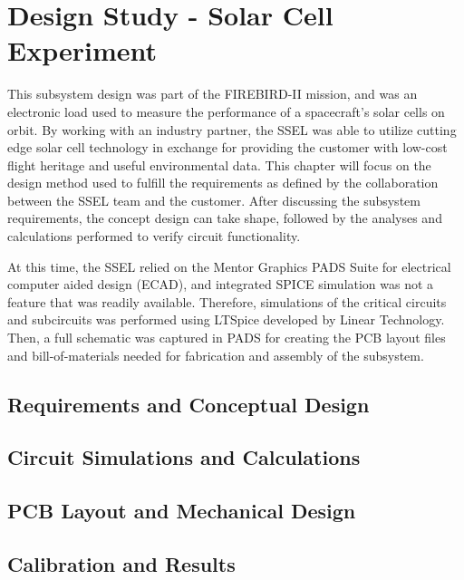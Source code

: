 \chapter{Design Study - Solar Cell Experiment}\label{CH:Design1}
This subsystem design was part of the FIREBIRD-II mission, and was an electronic load used to measure the performance of a spacecraft's solar cells on orbit. By working with an industry partner, the SSEL was able to utilize cutting edge solar cell technology in exchange for providing the customer with low-cost flight heritage and useful environmental data. This chapter will focus on the design method used to fulfill the requirements as defined by the collaboration between the SSEL team and the customer. After discussing the subsystem requirements, the concept design can take shape, followed by the analyses and calculations performed to verify circuit functionality. 

At this time, the SSEL relied on the Mentor Graphics PADS Suite for electrical computer aided design (ECAD), and integrated SPICE simulation was not a feature that was readily available. Therefore, simulations of the critical circuits and subcircuits was performed using LTSpice developed by Linear Technology. Then, a full schematic was captured in PADS for creating the PCB layout files and bill-of-materials needed for fabrication and assembly of the subsystem. 

\section{Requirements and Conceptual Design}\label{Sect:test}



\section{Circuit Simulations and Calculations}\label{Sect:test}



\section{PCB Layout and Mechanical Design}\label{Sect:test}



\section{Calibration and Results}\label{Sect:test}
